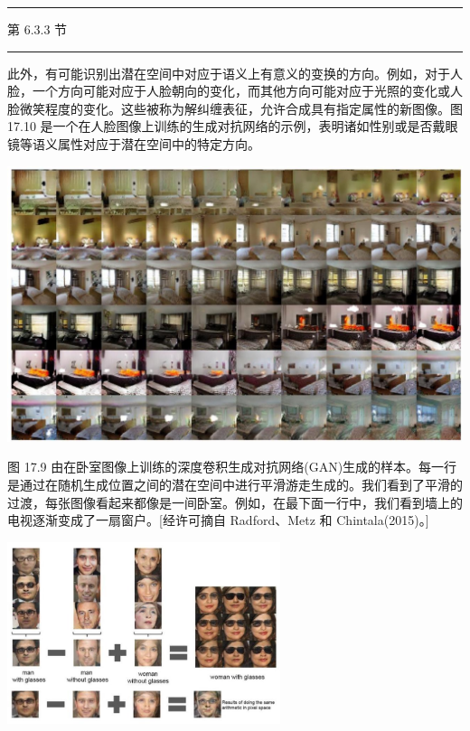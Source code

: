 \documentclass[10pt]{report}
\newcommand{\HRule}{\begin{center}\rule{0.9\linewidth}{0.2mm}\end{center}}
\begin{document}
\HRule

第 6.3.3 节

\HRule

此外，有可能识别出潜在空间中对应于语义上有意义的变换的方向。例如，对于人脸，一个方向可能对应于人脸朝向的变化，而其他方向可能对应于光照的变化或人脸微笑程度的变化。这些被称为解纠缠表征，允许合成具有指定属性的新图像。图 17.10 是一个在人脸图像上训练的生成对抗网络的示例，表明诸如性别或是否戴眼镜等语义属性对应于潜在空间中的特定方向。

\begin{center}
\includegraphics[max width=1.0\textwidth]{images/0194e279-9b28-703a-88f4-c3ac21e2010d_562_232_351_1291_782_0.jpg}
\end{center}
\hspace*{3em} 

图 17.9 由在卧室图像上训练的深度卷积生成对抗网络(GAN)生成的样本。每一行是通过在随机生成位置之间的潜在空间中进行平滑游走生成的。我们看到了平滑的过渡，每张图像看起来都像是一间卧室。例如，在最下面一行中，我们看到墙上的电视逐渐变成了一扇窗户。[经许可摘自 Radford、Metz 和 Chintala(2015)。]

\begin{center}
\includegraphics[max width=0.6\textwidth]{images/0194e279-9b28-703a-88f4-c3ac21e2010d_562_709_1479_795_529_0.jpg}
\end{center}
\hspace*{3em} 
\end{document}
